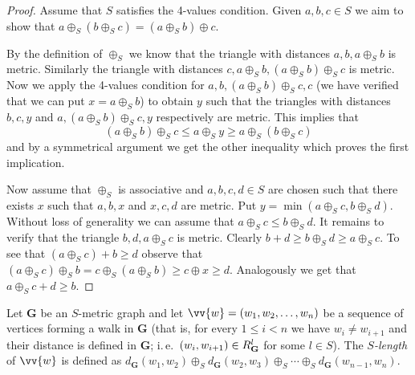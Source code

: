 \documentclass{elsarticle}
\newcommand{\ie}{i.\,e.}
\def\str#1{\mathbf {#1}}
\def\nbrel#1#2{R\ifstrempty{#1}{}{_{#1}}\ifstrempty{#2}{}{^{#2}}}
\def\rel#1#2{\nbrel{\ifstrempty{#1}{}{\str{#1}}}{#2}}
\theoremstyle{plain}
\theoremstyle{definition}
\theoremstyle{remark}
\begin{document}
\begin{proof}
Assume that $S$ satisfies the 4-values condition. Given $a,b,c\in S$ we aim to show that $a\oplus_S (b\oplus_S c)=(a\oplus_S b)\oplus c$.

By the definition of $\oplus_S$ we 
 know that the triangle with distances $a,b,a\oplus_S b$ is metric. Similarly the triangle with distances $c,a\oplus_S b,(a\oplus_S b)\oplus_S c$ is metric.
Now we apply the 4-values condition for $a,b,(a\oplus_S b)\oplus_S c,c$ (we have verified that we can put $x=a\oplus_S b$)
to obtain $y$ such that the triangles with distances $b,c,y$ and $a,(a\oplus_S b)\oplus_S c,y$ respectively are metric.
This implies that $$(a\oplus_S b)\oplus_S c\leq a\oplus_S y\geq a\oplus_S (b\oplus_S c)$$ and by a symmetrical argument we get the other inequality which proves the first implication.

Now assume that $\oplus_S$ is associative and $a,b,c,d\in S$ are chosen such that there exists $x$
such that $a,b,x$ and $x,c,d$ are metric. Put $y=\min (a\oplus_S c,b\oplus_S d)$.
Without loss of generality we can assume that $a\oplus_S c\leq b\oplus_S d$. It remains to verify that the
triangle $b,d,a\oplus_S c$ is metric. Clearly $b+d\geq b\oplus_S d \geq a\oplus_S c$. To see that
$(a\oplus_S c)+b\geq d$ observe that $(a\oplus_S c)\oplus_S b=c\oplus_S (a\oplus_S b)\geq c\oplus x\geq d$.
Analogously we get that $a\oplus_S c+d\geq b$.
\end{proof}

Let $\str{G}$ be an $S$-metric graph and let $\vv{w}=(w_1,w_2,\ldots, w_n)$ be a sequence
of vertices forming a walk in $\str{G}$ (that is, for every $1\leq i<n$ we
have $w_i\neq w_{i+1}$ and their distance is defined in $\str{G}$; \ie{}\ $(w_i, w_{i+1})\in \rel{G}{l}$ for some $l\in S$). The \emph{$S$-length} of $\vv{w}$ is defined as $d_\str{G}(w_1,w_2)\oplus_S d_\str{G}(w_2,w_3)\oplus_S \cdots \oplus_S d_\str{G}(w_{n-1},w_n)$.
\end{document}
